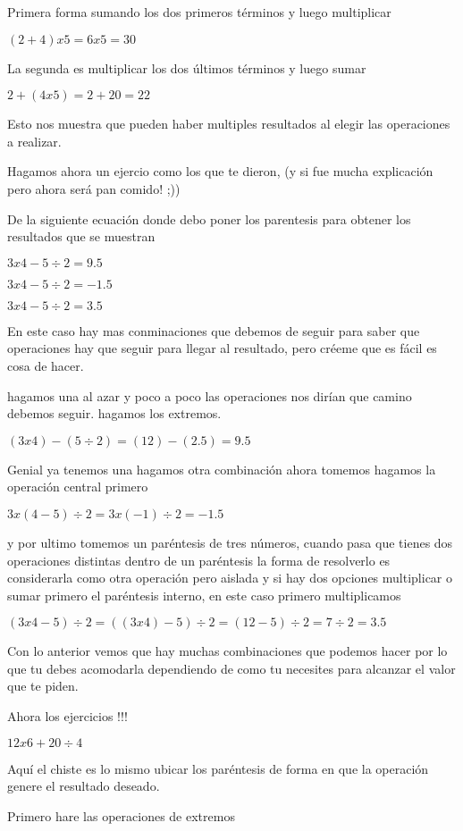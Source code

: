 \documentclass[10pt]{article}
\newcommand{\ec}[1]{\begin{center} $#1$ \end{center}}
\begin{document}
    Primera forma sumando los dos primeros términos y luego multiplicar

    \ec{(2+4)x5=6x5=30}

    La segunda es multiplicar los dos últimos términos y luego sumar 

    \ec{2+(4x5)=2+20=22}

    Esto nos muestra que pueden haber multiples resultados al elegir las operaciones a realizar.

    Hagamos ahora un ejercio como los que te dieron, (y si fue mucha explicación pero ahora será pan comido! ;))

    De la siguiente ecuación donde debo poner los parentesis para obtener los resultados que se muestran 

    \ec{3x4-5\div2=9.5}
    \ec{3x4-5\div2=-1.5}
    \ec{3x4-5\div2=3.5}

    En este caso hay mas conminaciones que debemos de seguir para saber que operaciones hay que seguir para llegar al resultado, pero créeme que es fácil es cosa de hacer.

    hagamos una al azar y poco a poco las operaciones nos dirían que camino debemos seguir.
    hagamos los extremos.

    \ec{(3x4)-(5\div2)=(12)-(2.5)=9.5}

    Genial ya tenemos una hagamos otra combinación ahora tomemos hagamos la operación central primero 

    \ec{3x(4-5)\div2=3x(-1)\div2=-1.5}

    y por ultimo tomemos un paréntesis de tres números, cuando pasa que tienes dos operaciones distintas dentro de un paréntesis la forma de resolverlo es considerarla como otra operación pero aislada y si hay dos opciones multiplicar o sumar primero el paréntesis interno, en este caso primero multiplicamos

    \ec{(3x4-5)\div2=((3x4)-5)\div2=(12-5)\div2=7\div2=3.5}

    Con lo anterior vemos que hay muchas combinaciones que podemos hacer por lo que tu debes acomodarla dependiendo de como tu necesites para alcanzar el valor que te piden.

    Ahora los ejercicios !!!

    \ec{12x6+20\div4}

    Aquí el chiste es lo mismo ubicar los paréntesis de forma en que la operación genere el resultado deseado.

    Primero hare las operaciones de extremos 
\end{document}
